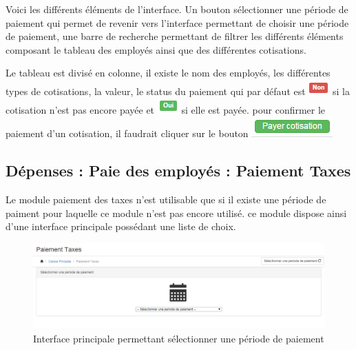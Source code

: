 \documentclass[12pt,a4paper]{report}
\begin{document}
Voici les différents éléments de l'interface. Un bouton sélectionner une période de paiement qui permet de revenir vers l'interface permettant de choisir une période de paiement, une barre de recherche permettant de filtrer les différents éléments composant le tableau des employés ainsi que des différentes cotisations.

Le tableau est divisé en colonne, il existe le nom des employés, les différentes types de cotisations, la valeur, le status du paiement qui par défaut est \includegraphics[scale=0.7]{pic/NonTaxes.png} si la cotisation n'est pas encore payée et \includegraphics[scale=0.7]{pic/OuiTaxes.png} si elle est payée. pour confirmer le paiement d'un cotisation, il faudrait cliquer sur le bouton \includegraphics[scale=0.7]{pic/CotPayBouton.png}

\subsection{Dépenses : Paie des employés : Paiement Taxes}
Le module paiement des taxes n'est utilisable que si il existe une période de paiment pour laquelle ce module n'est pas encore utilisé. ce module dispose ainsi d'une interface principale possédant une liste de choix.

\begin{figure}[h]
\begin{center}
\includegraphics[width=14cm]{pic/PaieTaxes.png}
\end{center}
\caption{Interface principale permettant sélectionner une période de paiement}
\label{Interface principale permettant sélectionner une période de paiement}
\end{figure}
\end{document}
